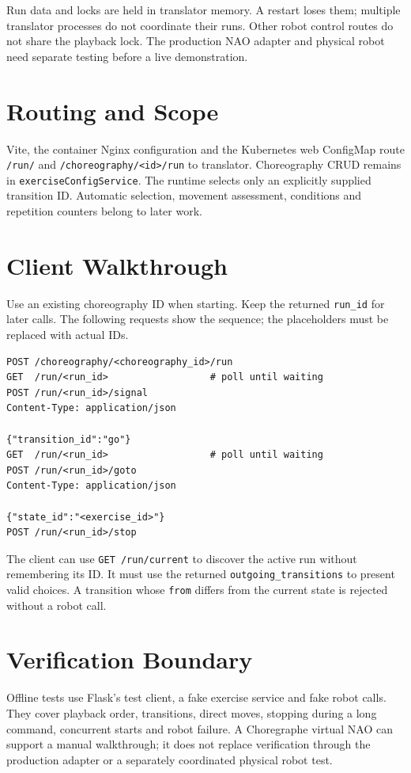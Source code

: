 \documentclass[12pt,a4paper]{article}
\begin{document}
Run data and locks are held in translator memory. A restart loses them;
multiple translator processes do not coordinate their runs. Other robot
control routes do not share the playback lock. The production NAO adapter
and physical robot need separate testing before a live demonstration.

\section{Routing and Scope}

Vite, the container Nginx configuration and the Kubernetes web ConfigMap
route \texttt{/run/} and \texttt{/choreography/<id>/run} to translator.
Choreography CRUD remains in \texttt{exerciseConfigService}. The runtime
selects only an explicitly supplied transition ID. Automatic selection,
movement assessment, conditions and repetition counters belong to later work.

\section{Client Walkthrough}

Use an existing choreography ID when starting. Keep the returned
\texttt{run\_id} for later calls. The following requests show the sequence;
the placeholders must be replaced with actual IDs.

\begin{lstlisting}
POST /choreography/<choreography_id>/run
GET  /run/<run_id>                  # poll until waiting
POST /run/<run_id>/signal
Content-Type: application/json

{"transition_id":"go"}
GET  /run/<run_id>                  # poll until waiting
POST /run/<run_id>/goto
Content-Type: application/json

{"state_id":"<exercise_id>"}
POST /run/<run_id>/stop
\end{lstlisting}

The client can use \texttt{GET /run/current} to discover the active run
without remembering its ID. It must use the returned
\texttt{outgoing\_transitions} to present valid choices. A transition whose
\texttt{from} differs from the current state is rejected without a robot call.

\section{Verification Boundary}

Offline tests use Flask's test client, a fake exercise service and fake robot
calls. They cover playback order, transitions, direct moves, stopping during a
long command, concurrent starts and robot failure. A Choregraphe virtual NAO
can support a manual walkthrough; it does not replace verification through the
production adapter or a separately coordinated physical robot test.
\end{document}
